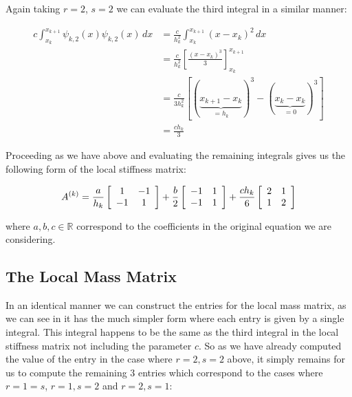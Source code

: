 Again taking $r=2$, $s=2$ we can evaluate the third integral in a similar manner:

\begin{align*}
    c\int_{x_k}^{x_{k+1}}\psi_{k,2}(x)\psi_{k,2}(x)\, dx
       &= \frac{c}{h_k^2}\int_{x_k}^{x_{k + 1}}(x - x_k)^2\, dx \\
       &= \frac{c}{h_k^2}\left[ \frac{(x - x_k)^3}{3} \right]_{x_k}^{x_{k+1}} \\
       &= \frac{c}{3h_k^2}\left[ (\underbrace{x_{k+1} - x_k}_{= h_k})^3
                            -(\underbrace{x_k - x_k}_{=0})^3\right] \\
       &= \frac{ch_k}{3}
\end{align*}

Proceeding as we have above and evaluating the remaining integrals gives us the
following form of the local stiffness matrix:


\begin{equation}\label{eq:oned-determinisitic-local-stiffness}
    A^{(k)} = \frac{a}{h_k}\left[\begin{array}{c c}
                1 & -1 \\ -1 & 1
              \end{array}\right]
              +\frac{b}{2}\left[\begin{array}{c c}
                -1 & 1\\ -1 & 1
              \end{array}\right]
              + \frac{ch_k}{6}\left[\begin{array}{c c}
                2 & 1 \\ 1 & 2
              \end{array}\right]
\end{equation}

where $a,b,c \in \mathbb{R}$ correspond to the coefficients in the original
equation  we are considering.

\subsection{The Local Mass Matrix}\label{sec:oned-deterministic-local-mass}

In an identical manner we can construct the entries for the local mass matrix,
as we can see in  it has the much
simpler form where each entry is given by a single integral. This integral
happens to be the same as the third integral in the local stiffness matrix not
including the parameter $c$. So as we have already computed  the value of the
entry in the case where $r = 2, s = 2$ above, it simply remains for us to
compute the remaining 3 entries which correspond to the cases where $r = 1 =
s$, $r = 1, s = 2$ and $r = 2, s = 1$:


